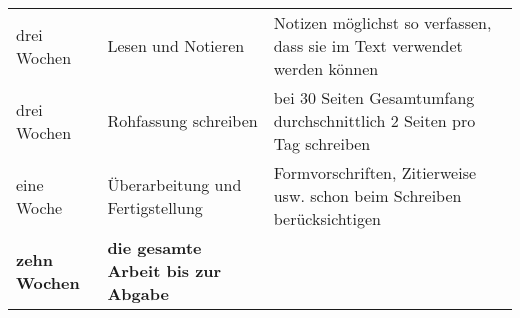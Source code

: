 \documentclass[]{article}
\begin{document}
\begin{longtable}[]{@{}lll@{}}
\begin{minipage}[t]{0.14\columnwidth}
drei Wochen\strut
\end{minipage} & \begin{minipage}[t]{0.40\columnwidth}\raggedright\strut
Lesen und Notieren\strut
\end{minipage} & \begin{minipage}[t]{0.37\columnwidth}\raggedright\strut
Notizen möglichst so verfassen, dass sie im Text verwendet werden
können\strut
\end{minipage}\tabularnewline
\begin{minipage}[t]{0.14\columnwidth}\raggedright\strut
drei Wochen\strut
\end{minipage} & \begin{minipage}[t]{0.40\columnwidth}\raggedright\strut
Rohfassung schreiben\strut
\end{minipage} & \begin{minipage}[t]{0.37\columnwidth}\raggedright\strut
bei 30 Seiten Gesamtumfang durchschnittlich 2 Seiten pro Tag
schreiben\strut
\end{minipage}\tabularnewline
\begin{minipage}[t]{0.14\columnwidth}\raggedright\strut
eine Woche\strut
\end{minipage} & \begin{minipage}[t]{0.40\columnwidth}\raggedright\strut
Überarbeitung und Fertigstellung\strut
\end{minipage} & \begin{minipage}[t]{0.37\columnwidth}\raggedright\strut
Formvorschriften, Zitierweise usw. schon beim Schreiben
berücksichtigen\strut
\end{minipage}\tabularnewline
\begin{minipage}[t]{0.14\columnwidth}\raggedright\strut
\textbf{zehn Wochen}\strut
\end{minipage} & \begin{minipage}[t]{0.40\columnwidth}\raggedright\strut
\textbf{die gesamte Arbeit bis zur Abgabe}\strut
\end{minipage} & \begin{minipage}[t]{0.37\columnwidth}\raggedright\strut
\strut
\end{minipage}\tabularnewline
\bottomrule
\end{longtable}
\end{document}
